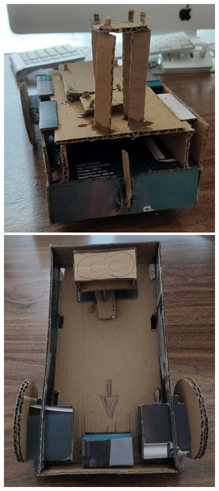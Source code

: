 \begin{figure}[ht!]
\begin{minipage}{0.4\linewidth}
		\caption*{\centering}
	\end{minipage}
	\hspace{2cm}
	\begin{minipage}{0.45\linewidth}
		\centering
		\includegraphics[width=\linewidth]{figs/cap5/boceto_carton6.jpeg}
		\caption*{\centering}
	\end{minipage}
	\hspace{2cm}
	\begin{minipage}{0.4\linewidth}
		\centering
		\includegraphics[width=\linewidth]{figs/cap5/boceto_carton7.jpeg}

\end{minipage}
\end{figure}
